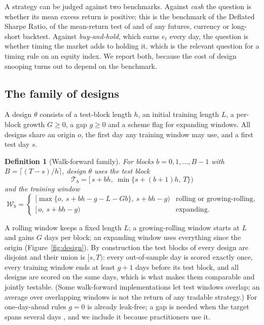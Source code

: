 \documentclass[pdflatex,sn-basic]{sn-jnl}
\theoremstyle{thmstyleone}
\theoremstyle{thmstylethree}
\newtheorem{definition}{Definition}
\begin{document}
A strategy can be judged against two benchmarks. Against \emph{cash} the question is whether its mean
excess return is positive; this is the benchmark of the Deflated Sharpe Ratio, of the mean-return test
of \citet{sullivan1999} and of any futures, currency or long-short backtest. Against
\emph{buy-and-hold}, which earns $e_t$ every day, the question is whether timing the market adds to
holding it, which is the relevant question for a timing rule on an equity index. We report both,
because the cost of design snooping turns out to depend on the benchmark.

\subsection{The family of designs}

A design $\theta$ consists of a test-block length $h$, an initial training length $L$, a per-block growth
$G\ge 0$, a gap $g\ge 0$ and a scheme flag for expanding windows. All designs share an origin $o$, the
first day any training window may use, and a first test day $s$.

\begin{definition}[Walk-forward family]\label{def:family}
For blocks $b=0,1,\dots,B-1$ with $B=\lceil (T-s)/h\rceil$, design $\theta$ uses the test block
\[
\mathcal{T}_b=\bigl[\,s+bh,\ \min\{s+(b+1)h,\,T\}\bigr)
\]
and the training window
\[
\mathcal{W}_b=\begin{cases}
\bigl[\max\{o,\ s+bh-g-L-Gb\},\ s+bh-g\bigr) & \text{rolling or growing-rolling,}\\[2pt]
\bigl[\,o,\ s+bh-g\bigr) & \text{expanding.}
\end{cases}
\]
\end{definition}

A rolling window keeps a fixed length $L$; a growing-rolling window starts at $L$ and gains $G$ days per
block; an expanding window uses everything since the origin (Figure~\ref{fig:design}). By construction
the test blocks of every design are disjoint and their union is $[s,T)$: every out-of-sample day is
scored exactly once, every training window ends at least $g+1$ days before its test block, and all
designs are scored on the same days, which is what makes them comparable and jointly testable. (Some
walk-forward implementations let test windows overlap; an average over overlapping windows is not the
return of any tradable strategy.) For one-day-ahead rules $g=0$ is already leak-free; a gap is needed
when the target spans several days \citep{burman1994,racine2000,lopezdeprado2018}, and we include it
because practitioners use it.
\end{document}
